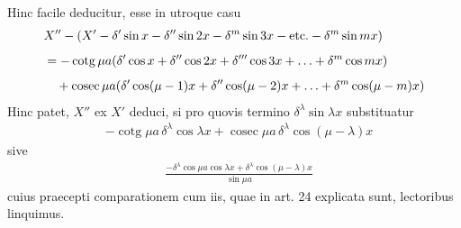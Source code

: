 Hinc facile deducitur, esse in utroque casu
\[
\begin{aligned}
&X''-(X'-\delta'\sin x-\delta''\sin2x-\delta^m\sin3x-\text{etc.}-\delta^m\sin mx)\\[5pt]
&=-\operatorname{cotg}\mu a(\delta'\cos x+\delta''\cos2x+\delta'''\cos3x+\mathinner{.\,.\,.}+\delta^m\cos mx)\\[5pt]
&\quad+\operatorname{cosec}\mu a(\delta'\cos(\mu-1)x+\delta''\cos(\mu-2)x+\mathinner{.\,.\,.}+\delta^m\cos(\mu-m)x)
\end{aligned}
\]
Hinc patet, $X''$ ex $X'$ deduci, si pro quovis termino $\delta^\lambda\sin\lambda x$ substituatur
\[
\begin{aligned}
&-\operatorname{cotg}\mu a\,\delta^\lambda\cos\lambda x+\operatorname{cosec}\mu a\,\delta^\lambda\cos(\mu-\lambda)x
\end{aligned}
\]
sive
\[
\begin{aligned}
&\frac{-\delta^\lambda\cos\mu a\cos\lambda x+\delta^\lambda\cos(\mu-\lambda)x}{\sin\mu a}
\end{aligned}
\]
cuius praecepti comparationem cum iis, quae in art. 24 explicata sunt, lectoribus
linquimus.

